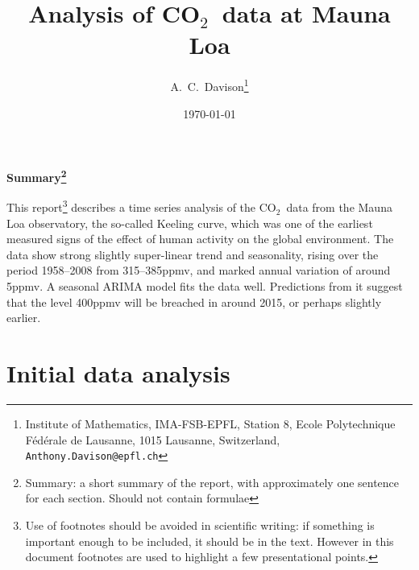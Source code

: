 \documentclass[a4paper,11pt]{article}\usepackage[]{graphicx}\usepackage[]{color}
\def\CO{{CO$_{2}$}}
\begin{document}
\thispagestyle{empty}
\title{Analysis of \CO\ data at Mauna Loa}
\author{
A.~C.~Davison\footnote{Institute of Mathematics, IMA-FSB-EPFL, Station 8, 
Ecole Polytechnique F\'ed\'erale de Lausanne,
1015 Lausanne, Switzerland, {\tt Anthony.Davison@epfl.ch}} 
} 
\date{\today}

\maketitle 
{
\bigskip\centerline{\bf Summary\footnote{Summary: a short summary of the report, with approximately one sentence for each section.  Should not contain formulae}  }

\noindent This report\footnote{Use of footnotes should be avoided in scientific writing: if something is important enough to be included, it should be in the text.  However in this document footnotes are used to highlight a few presentational points.}   describes a time series analysis of the \CO\ data from the Mauna Loa observatory, the so-called Keeling curve, which was one of the earliest measured signs of the effect of human activity on the global environment.  The data show strong slightly super-linear trend and seasonality, rising over the period 1958--2008 from 315--385ppmv, and marked annual variation of around 5ppmv.  A seasonal ARIMA model fits the data well.  Predictions from it suggest that the level 400ppmv will be breached in around 2015, or perhaps slightly earlier.
 }

\newpage



\section{Initial data analysis}
\end{document}
